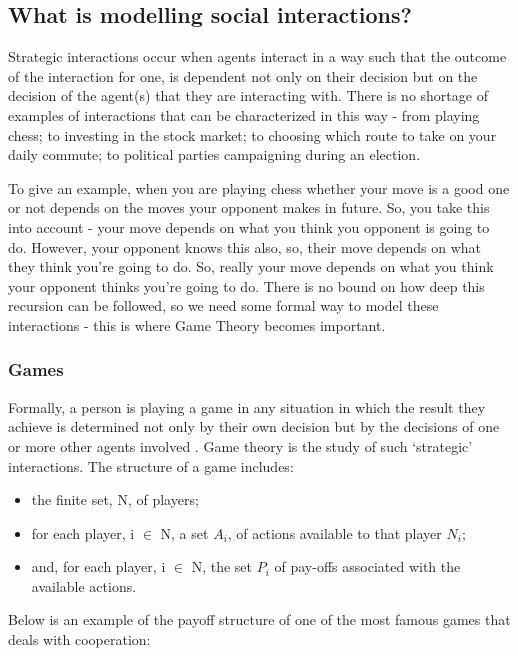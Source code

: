 \documentclass[11pt]{article}
\newcommand*{\np}{\par\noindent\newline}
\begin{document}
\subsection{What is modelling social interactions?}\label{modelling_social_interactions}
Strategic interactions occur when agents interact in a way such that the
outcome of the interaction for one, is dependent not only on their decision
but on the decision of the agent(s) that they are interacting with. There is no
shortage of examples of interactions that can be characterized in this way -
from playing chess; to investing in the stock market; to choosing which route
to take on your daily commute; to political parties campaigning during an
election.
\np To give an example, when you are playing chess whether your move is a good
one or not depends on the moves your opponent makes in future. So, you take
this into account - your move depends on what you think you opponent is going
to do. However, your opponent knows this also, so, their move depends on what
they think you're going to do. So, really your move depends on what you think
your opponent thinks you're going to do. There is no bound on how deep this
recursion can be followed, so we need some formal way to model these
interactions - this is where Game Theory becomes important.
\subsubsection{Games}
Formally, a person is playing a game in any situation in which the result they
achieve is determined not only by their own decision but by the decisions of
one or more other agents involved \cite{angner_course_2012}. Game theory is the
study of such `strategic' interactions.
The structure of a game includes:
\begin{itemize}
	\item the finite set, N, of players;
	\item for each player, i $\in$ N, a set $A_i$, of actions available to that
	player $N_i$;
	\item and, for each player, i $\in$ N, the set $P_i$ of pay-offs associated
	with the available actions.
\end{itemize}
\cite{osborne_course_1994}
\np Below is an example of the payoff structure of one of the most famous games
that deals with cooperation: 
\end{document}
